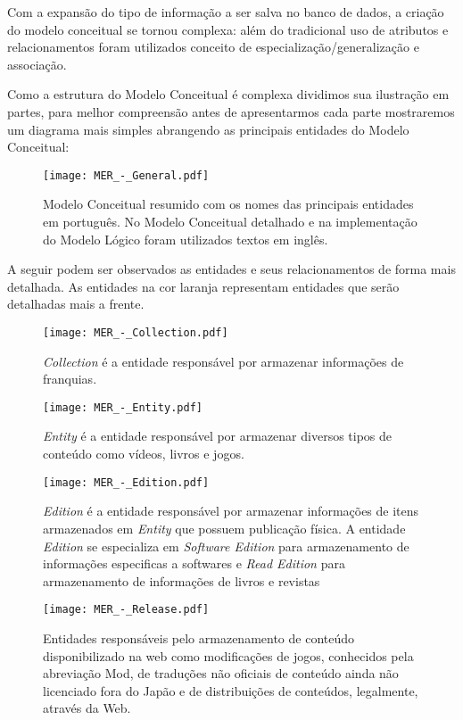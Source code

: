\documentclass[12pt]{article}
\begin{document}
Com a expansão do tipo de informação a ser salva no banco de dados, a criação do modelo conceitual se tornou complexa: além do tradicional uso de atributos e relacionamentos foram utilizados conceito de especialização/generalização e associação. 

Como a estrutura do Modelo Conceitual é complexa dividimos sua ilustração em partes, para melhor compreensão antes de apresentarmos cada parte mostraremos um diagrama mais simples abrangendo as principais entidades do Modelo Conceitual:

\begin{figure}[H]
\centering
\texttt{[image: MER\_-\_General.pdf]}
\caption{Modelo Conceitual resumido com os nomes das principais entidades em português. No Modelo Conceitual detalhado e na implementação do Modelo Lógico foram utilizados textos em inglês.} \label{collection}
\end{figure}

A seguir podem ser observados as entidades e seus relacionamentos de forma mais detalhada. As entidades na cor laranja representam entidades que serão detalhadas mais a frente.
\begin{figure}[H]
\centering
\texttt{[image: MER\_-\_Collection.pdf]}
\caption{\textit{Collection} é a entidade responsável por armazenar informações de franquias.} \label{collection}
\end{figure}

\begin{figure}[H]
\centering
\texttt{[image: MER\_-\_Entity.pdf]}
\caption{\textit{Entity} é a entidade responsável por armazenar diversos tipos de conteúdo como vídeos, livros e jogos.} \label{entity}
\end{figure}

\begin{figure}[H]
\centering
\texttt{[image: MER\_-\_Edition.pdf]}
\caption{\textit{Edition} é a entidade responsável por armazenar informações de itens armazenados em \textit{Entity} que possuem publicação física. A entidade \textit{Edition} se especializa em \textit{Software Edition} para armazenamento de informações especificas a softwares e \textit{Read Edition} para armazenamento de informações de livros e revistas}\label{edition}
\end{figure}

\begin{figure}[H]
\centering
\texttt{[image: MER\_-\_Release.pdf]}
\caption{Entidades responsáveis pelo armazenamento de conteúdo disponibilizado na web como modificações de jogos, conhecidos pela abreviação Mod, de traduções não oficiais de conteúdo ainda não licenciado fora do Japão e de distribuições de conteúdos, legalmente, através da Web.} \label{Release}
\end{figure}
\end{document}
